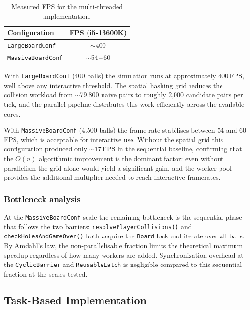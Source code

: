 \documentclass[12pt,a4paper]{article}
\begin{document}
\begin{table}[H]
\centering
\begin{tabular}{lc}
\hline
\textbf{Configuration} & \textbf{FPS (i5-13600K)} \\
\hline
\texttt{LargeBoardConf}    & $\sim$400  \\
\texttt{MassiveBoardConf}  & $\sim$54\,--\,60  \\
\hline
\end{tabular}
\caption{Measured FPS for the multi-threaded implementation.}
\label{tab:mt-fps}
\end{table}

With \texttt{LargeBoardConf} (400 balls) the simulation runs at approximately
400\,FPS, well above any interactive threshold. The spatial hashing grid
reduces the collision workload from $\sim$79{,}800 naive pairs to roughly
2{,}000 candidate pairs per tick, and the parallel pipeline distributes
this work efficiently across the available cores.

With \texttt{MassiveBoardConf} (4{,}500 balls) the frame rate stabilises
between 54 and 60\,FPS, which is acceptable for interactive use. Without
the spatial grid this configuration produced only $\sim$17\,FPS in the
sequential baseline, confirming that the $O(n) $ algorithmic improvement
is the dominant factor: even without parallelism the grid alone would
yield a significant gain, and the worker pool provides the additional
multiplier needed to reach interactive framerates.

\subsubsection*{Bottleneck analysis}

At the \texttt{MassiveBoardConf} scale the remaining bottleneck is the
sequential phase that follows the two barriers:
\texttt{resolvePlayerCollisions()} and \texttt{checkHolesAndGameOver()}
both acquire the \texttt{Board} lock and iterate over all balls. By
Amdahl's law, the non-parallelisable fraction limits the theoretical
maximum speedup regardless of how many workers are added. Synchronization
overhead at the \texttt{CyclicBarrier} and \texttt{ReusableLatch} is
negligible compared to this sequential fraction at the scales tested.

\subsection{Task-Based Implementation}
\end{document}
